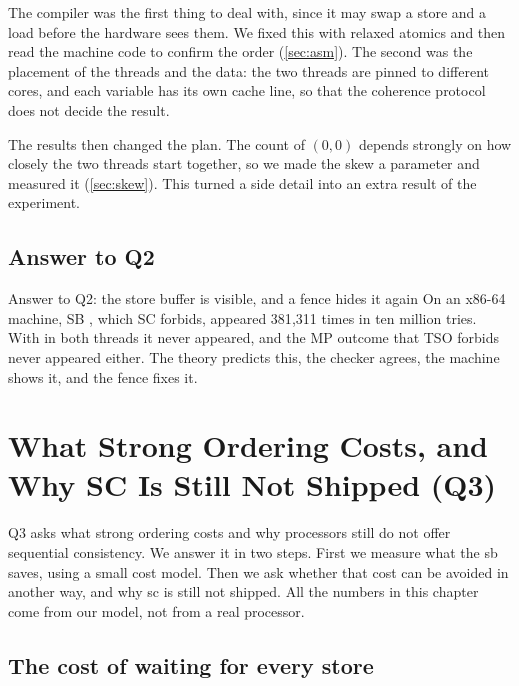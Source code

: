 The compiler was the first thing to deal with, since it may swap a store and a load before the hardware sees them. We fixed this with relaxed atomics and then read the machine code to confirm the order (\cref{sec:asm}). The second was the placement of the threads and the data: the two threads are pinned to different cores, and each variable has its own cache line, so that the coherence protocol does not decide the result.

The results then changed the plan. The count of $(0,0)$ depends strongly on how closely the two threads start together, so we made the skew a parameter and measured it (\cref{sec:skew}). This turned a side detail into an extra result of the experiment.

\section{Answer to Q2}
\label{sec:q2}

\begin{resultbox}{Answer to Q2: the store buffer is visible, and a fence hides it again}
On an x86-64 machine, SB , which SC forbids, appeared 381{,}311 times in ten million tries. With  in both threads it never appeared, and the MP outcome that TSO forbids never appeared either. The theory predicts this, the checker agrees, the machine shows it, and the fence fixes it.
\end{resultbox}

\chapter{What Strong Ordering Costs, and Why SC Is Still Not Shipped (Q3)}
\label{ch:cost}

Q3 asks what strong ordering costs and why processors still do not offer sequential consistency. We answer it in two steps. First we measure what the \gls{sb} saves, using a small cost model. Then we ask whether that cost can be avoided in another way, and why \gls{sc} is still not shipped. All the numbers in this chapter come from our model, not from a real processor.

\section{The cost of waiting for every store}
\label{sec:boe}

